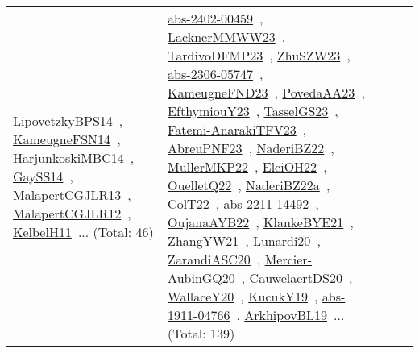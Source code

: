 {\begin{longtable}{lp{3cm}>{\raggedright\arraybackslash}p{6cm}>{\raggedright\arraybackslash}p{6cm}>{\raggedright\arraybackslash}p{8cm}}
\href{works/LipovetzkyBPS14.pdf}{LipovetzkyBPS14}~\cite{LipovetzkyBPS14}, \href{works/KameugneFSN14.pdf}{KameugneFSN14}~\cite{KameugneFSN14}, \href{works/HarjunkoskiMBC14.pdf}{HarjunkoskiMBC14}~\cite{HarjunkoskiMBC14}, \href{works/GaySS14.pdf}{GaySS14}~\cite{GaySS14}, \href{works/MalapertCGJLR13.pdf}{MalapertCGJLR13}~\cite{MalapertCGJLR13}, \href{works/MalapertCGJLR12.pdf}{MalapertCGJLR12}~\cite{MalapertCGJLR12}, \href{works/KelbelH11.pdf}{KelbelH11}~\cite{KelbelH11}... (Total: 46) & \href{works/abs-2402-00459.pdf}{abs-2402-00459}~\cite{abs-2402-00459}, \href{works/LacknerMMWW23.pdf}{LacknerMMWW23}~\cite{LacknerMMWW23}, \href{works/TardivoDFMP23.pdf}{TardivoDFMP23}~\cite{TardivoDFMP23}, \href{works/ZhuSZW23.pdf}{ZhuSZW23}~\cite{ZhuSZW23}, \href{works/abs-2306-05747.pdf}{abs-2306-05747}~\cite{abs-2306-05747}, \href{works/KameugneFND23.pdf}{KameugneFND23}~\cite{KameugneFND23}, \href{works/PovedaAA23.pdf}{PovedaAA23}~\cite{PovedaAA23}, \href{works/EfthymiouY23.pdf}{EfthymiouY23}~\cite{EfthymiouY23}, \href{works/TasselGS23.pdf}{TasselGS23}~\cite{TasselGS23}, \href{works/Fatemi-AnarakiTFV23.pdf}{Fatemi-AnarakiTFV23}~\cite{Fatemi-AnarakiTFV23}, \href{works/AbreuPNF23.pdf}{AbreuPNF23}~\cite{AbreuPNF23}, \href{works/NaderiBZ22.pdf}{NaderiBZ22}~\cite{NaderiBZ22}, \href{works/MullerMKP22.pdf}{MullerMKP22}~\cite{MullerMKP22}, \href{works/ElciOH22.pdf}{ElciOH22}~\cite{ElciOH22}, \href{works/OuelletQ22.pdf}{OuelletQ22}~\cite{OuelletQ22}, \href{works/NaderiBZ22a.pdf}{NaderiBZ22a}~\cite{NaderiBZ22a}, \href{works/ColT22.pdf}{ColT22}~\cite{ColT22}, \href{works/abs-2211-14492.pdf}{abs-2211-14492}~\cite{abs-2211-14492}, \href{works/OujanaAYB22.pdf}{OujanaAYB22}~\cite{OujanaAYB22}, \href{works/KlankeBYE21.pdf}{KlankeBYE21}~\cite{KlankeBYE21}, \href{works/ZhangYW21.pdf}{ZhangYW21}~\cite{ZhangYW21}, \href{works/Lunardi20.pdf}{Lunardi20}~\cite{Lunardi20}, \href{works/ZarandiASC20.pdf}{ZarandiASC20}~\cite{ZarandiASC20}, \href{works/Mercier-AubinGQ20.pdf}{Mercier-AubinGQ20}~\cite{Mercier-AubinGQ20}, \href{works/CauwelaertDS20.pdf}{CauwelaertDS20}~\cite{CauwelaertDS20}, \href{works/WallaceY20.pdf}{WallaceY20}~\cite{WallaceY20}, \href{works/KucukY19.pdf}{KucukY19}~\cite{KucukY19}, \href{works/abs-1911-04766.pdf}{abs-1911-04766}~\cite{abs-1911-04766}, \href{works/ArkhipovBL19.pdf}{ArkhipovBL19}~\cite{ArkhipovBL19}... (Total: 139)\\

\end{longtable}}
